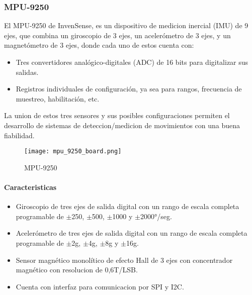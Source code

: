         \subsubsection{MPU-9250}
            El MPU-9250 de InvenSense, es un dispositivo de medicion inercial (IMU) de 9 ejes, que combina 
            un giroscopio de 3 ejes, un acelerómetro de 3 ejes, y un magnetómetro de 3 ejes, donde cada 
            uno de estos cuenta con:
                \begin{itemize}
                    \item Tres convertidores analógico-digitales (ADC) de 16 bits para digitalizar sus salidas. 
                    \item Registros individuales de configuración, ya sea para rangos, frecuencia de muestreo, habilitación, etc.
                \end{itemize}

            La union de estos tres sensores y sus posibles configuraciones permiten el desarrollo de sistemas de deteccion/medicion de 
            movimientos con una buena fiabilidad. 

                \begin{figure}[htp]
                    \centering
                        \texttt{[image: mpu\_9250\_board.png]}
                        \caption{MPU-9250 }
                \end{figure}

            \paragraph{Caracteristicas}
                \begin{itemize}
                    \item Giroscopio de tres ejes de salida digital con un rango de escala completa programable de $ \pm $250, $ \pm $500, $ \pm $1000 y $ \pm $2000°/seg.
                    \item Acelerómetro de tres ejes de salida digital con un rango de escala completa programable de $ \pm $2g, $ \pm $4g, $ \pm $8g y $ \pm $16g.
                    \item Sensor magnético monolítico de efecto Hall de 3 ejes con concentrador magnético con resolucion de 0,6T/LSB.
                    \item Cuenta con interfaz para comunicacion por SPI y I2C.
                \end{itemize}


